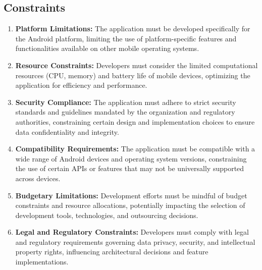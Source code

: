 \documentclass[]{article}
\begin{document}
\subsection{Constraints}
\label{sub:constraints}
\begin{enumerate}
	\item \textbf{Platform Limitations: }The application must be developed specifically for the Android platform, limiting the use of platform-specific features and functionalities available on other mobile operating systems.
	\item \textbf{Resource Constraints: }Developers must consider the limited computational resources (CPU, memory) and battery life of mobile devices, optimizing the application for efficiency and performance.
	\item \textbf{Security Compliance: }The application must adhere to strict security standards and guidelines mandated by the organization and regulatory authorities, constraining certain design and implementation choices to ensure data confidentiality and integrity.
	\item \textbf{Compatibility Requirements: }The application must be compatible with a wide range of Android devices and operating system versions, constraining the use of certain APIs or features that may not be universally supported across devices.
	\item \textbf{Budgetary Limitations: }Development efforts must be mindful of budget constraints and resource allocations, potentially impacting the selection of development tools, technologies, and outsourcing decisions.
	\item \textbf{Legal and Regulatory Constraints: }Developers must comply with legal and regulatory requirements governing data privacy, security, and intellectual property rights, influencing architectural decisions and feature implementations.

\end{enumerate}

\end{document}
